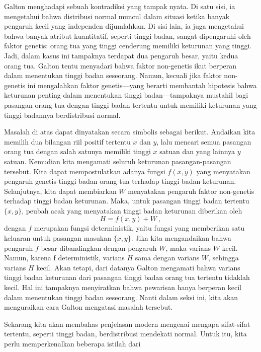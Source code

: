 \par
Galton menghadapi sebuah kontradiksi yang tampak nyata.  Di satu sisi, ia mengetahui bahwa
distribusi normal muncul dalam situasi ketika banyak pengaruh kecil yang independen dijumlahkan.
Di sisi lain, ia juga mengetahui bahwa banyak atribut kuantitatif, seperti tinggi badan, sangat
dipengaruhi oleh faktor genetis: orang tua yang tinggi cenderung memiliki keturunan yang tinggi.
Jadi, dalam kasus ini tampaknya terdapat dua pengaruh besar, yaitu kedua orang tua.  Galton tentu
menyadari bahwa faktor non-genetis ikut berperan dalam menentukan tinggi badan seseorang.  Namun,
kecuali jika faktor non-genetis ini mengalahkan faktor genetis---yang berarti membantah hipotesis
bahwa keturunan penting dalam menentukan tinggi badan---tampaknya mustahil bagi pasangan orang tua
dengan tinggi badan tertentu untuk memiliki keturunan yang tinggi badannya berdistribusi normal.
\par
Masalah di atas dapat dinyatakan secara simbolis sebagai berikut.  Andaikan kita memilih dua
bilangan riil positif tertentu $x$ dan $y$, lalu mencari semua pasangan orang tua dengan salah
satunya memiliki tinggi $x$ satuan dan yang lainnya $y$ satuan.  Kemudian kita mengamati seluruh
keturunan pasangan-pasangan tersebut.  Kita dapat mempostulatkan adanya fungsi $f(x, y)$ yang
menyatakan pengaruh genetis tinggi badan orang tua terhadap tinggi badan keturunan.  Selanjutnya,
kita dapat membiarkan $W$ menyatakan pengaruh faktor non-genetis terhadap tinggi badan keturunan.
Maka, untuk pasangan tinggi badan tertentu $\{x, y\}$, peubah acak yang menyatakan tinggi badan
keturunan diberikan oleh
$$H = f(x, y) + W\ ,$$
dengan $f$ merupakan fungsi deterministik, yaitu fungsi yang memberikan satu keluaran untuk
pasangan masukan $\{x, y\}$.  Jika kita mengandaikan bahwa pengaruh $f$ besar dibandingkan dengan
pengaruh $W$, maka varians $W$ kecil.  Namun, karena f deterministik, varians $H$ sama dengan
varians $W$, sehingga varians $H$ kecil.  Akan tetapi, dari datanya Galton mengamati bahwa varians
tinggi badan keturunan dari pasangan tinggi badan orang tua tertentu tidaklah kecil.  Hal ini
tampaknya menyiratkan bahwa pewarisan hanya berperan kecil dalam menentukan tinggi badan seseorang.
Nanti dalam seksi ini, kita akan menguraikan cara Galton mengatasi masalah tersebut.
\par
Sekarang kita akan membahas penjelasan modern mengenai mengapa sifat-sifat tertentu, seperti tinggi
badan, berdistribusi mendekati normal.  Untuk itu, kita perlu memperkenalkan beberapa istilah dari
